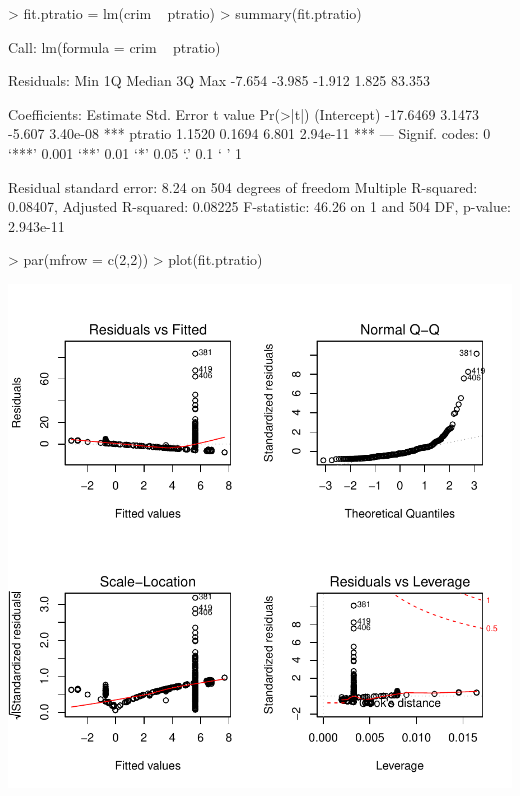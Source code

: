 \documentclass[a4paper]{article}
\begin{document}
\begin{Schunk}
\begin{Sinput}
> fit.ptratio = lm(crim ~ ptratio)
> summary(fit.ptratio)
\end{Sinput}
\begin{Soutput}
Call:
lm(formula = crim ~ ptratio)

Residuals:
   Min     1Q Median     3Q    Max 
-7.654 -3.985 -1.912  1.825 83.353 

Coefficients:
            Estimate Std. Error t value Pr(>|t|)    
(Intercept) -17.6469     3.1473  -5.607 3.40e-08 ***
ptratio       1.1520     0.1694   6.801 2.94e-11 ***
---
Signif. codes:  0 ‘***’ 0.001 ‘**’ 0.01 ‘*’ 0.05 ‘.’ 0.1 ‘ ’ 1

Residual standard error: 8.24 on 504 degrees of freedom
Multiple R-squared:  0.08407,	Adjusted R-squared:  0.08225 
F-statistic: 46.26 on 1 and 504 DF,  p-value: 2.943e-11
\end{Soutput}
\begin{Sinput}
> par(mfrow = c(2,2))
> plot(fit.ptratio)
\end{Sinput}
\end{Schunk}
\includegraphics{mutivariblelm-ptratio}
\end{document}
